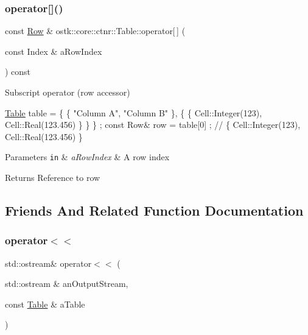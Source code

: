 \subsubsection{\texorpdfstring{operator[]()}{operator[]()}}
{\footnotesize\ttfamily const \hyperlink{classostk_1_1core_1_1ctnr_1_1table_1_1_row}{Row} \& ostk\+::core\+::ctnr\+::\+Table\+::operator\mbox{[}$\,$\mbox{]} (\begin{DoxyParamCaption}\item[{const Index \&}]{a\+Row\+Index }\end{DoxyParamCaption}) const}



Subscript operator (row accessor) 


\begin{DoxyCode}
\hyperlink{classostk_1_1core_1_1ctnr_1_1_table_a1b799fa804faf23f9dd4905df90a5cd7}{Table} table = \{ \{ \textcolor{stringliteral}{"Column A"}, \textcolor{stringliteral}{"Column B"} \}, \{ \{ Cell::Integer(123), Cell::Real(123.456) \} \} \} ;
\textcolor{keyword}{const} Row& row = table[0] ; \textcolor{comment}{// \{ Cell::Integer(123), Cell::Real(123.456) \}}
\end{DoxyCode}



\begin{DoxyParams}[1]{Parameters}
\mbox{\tt in}  & {\em a\+Row\+Index} & A row index \\
\hline
\end{DoxyParams}
\begin{DoxyReturn}{Returns}
Reference to row 
\end{DoxyReturn}


\subsection{Friends And Related Function Documentation}
\mbox{\label{classostk_1_1core_1_1ctnr_1_1_table_afaece709b2f143e4011941ae67b7adba}} 
\subsubsection{\texorpdfstring{operator$<$$<$}{operator<<}}
{\footnotesize\ttfamily std\+::ostream\& operator$<$$<$ (\begin{DoxyParamCaption}\item[{std\+::ostream \&}]{an\+Output\+Stream,  }\item[{const \hyperlink{classostk_1_1core_1_1ctnr_1_1_table}{Table} \&}]{a\+Table }\end{DoxyParamCaption})\hspace{0.3cm}{\ttfamily [friend]}}



